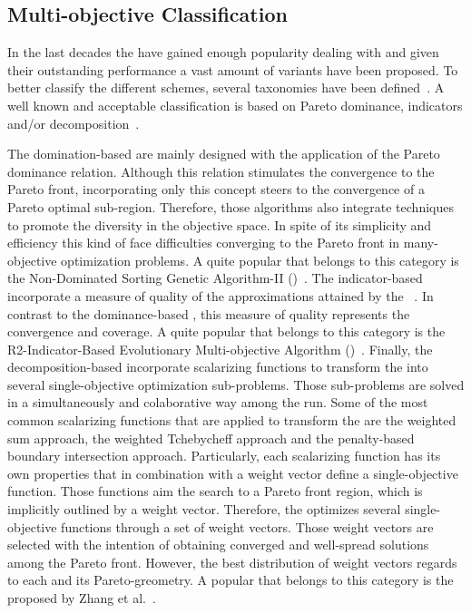 \subsection{Multi-objective Classification}


In the last decades the \MOEAS{} have gained enough popularity dealing with \MOPS{} and given their outstanding performance a vast amount of variants have been proposed.
%
To better classify the different schemes, several taxonomies have been defined~\cite{bechikh2016recent}.
%
A well known and acceptable classification is based on Pareto dominance, indicators and/or decomposition~\cite{trivedi2016survey}.
%


The domination-based \MOEAS{} are mainly designed with the application of the Pareto dominance relation.
%
Although this relation stimulates the convergence to the Pareto front, incorporating only this concept steers to the convergence of a Pareto optimal sub-region.
%
Therefore, those algorithms also integrate techniques to promote the diversity in the objective space.
%
%
%
In spite of its simplicity and efficiency this kind of \MOEAS{} face difficulties converging to the Pareto front in many-objective optimization problems.
%
A quite popular \MOEA{} that belongs to this category is the Non-Dominated Sorting Genetic Algorithm-II (\NSGAII{})~\cite{deb2002fast}.
%
The indicator-based \MOEAS{} incorporate a measure of quality of the approximations attained by the \MOEAS{}~\cite{beume2007sms}.
%
In contrast to the dominance-based \MOEAS{}, this measure of quality represents the convergence and coverage.
%
A quite popular \MOEA{} that belongs to this category is the R2-Indicator-Based Evolutionary Multi-objective Algorithm (\RMOEA{})~\cite{trautmann2013r2}.
%
Finally, the decomposition-based \MOEAS{} incorporate scalarizing functions to transform the \MOP{} into several single-objective optimization sub-problems.
%
Those sub-problems are solved in a simultaneously and colaborative way among the run.
%
Some of the most common scalarizing functions that are applied to transform the \MOP{} are the weighted sum approach, the weighted Tchebycheff approach and the penalty-based boundary intersection approach.
%
Particularly, each scalarizing function has its own properties that in combination with a weight vector define a single-objective function.
%
Those functions aim the search to a Pareto front region, which is implicitly outlined by a weight vector.
%
Therefore, the \MOEA{} optimizes several single-objective functions through a set of weight vectors.
%
Those weight vectors are selected with the intention of obtaining converged and well-spread solutions among the Pareto front.
%
However, the best distribution of weight vectors regards to each \MOP{} and its Pareto-greometry.
%
A popular \MOEA{} that belongs to this category is the \MOEAD{} proposed by Zhang et al.~\cite{zhang2007moea}.


